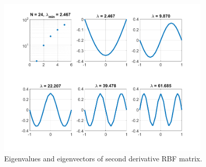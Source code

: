 \begin{solution}
    \begin{figure}[h]
        \centering
        \includegraphics*[width=0.9\textwidth]{problem_3i_helmholtz.png}
        \caption{Eigenvalues and eigenvectors of second derivative RBF matrix.}
        \label{fig:problem_3i_helmholtz_eig}
    \end{figure}
\end{solution}